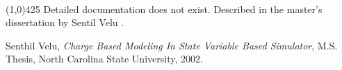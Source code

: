 \documentclass{article}
\begin{document}
\\
\hrulefill\linethickness{0.5mm}\line(1,0){425} \normalsize
\newline
Detailed documentation does not exist. Described in the master's dissertation by Sentil Velu \cite{velu:ms}.

\begin{thebibliography}{9}
Senthil Velu, \emph{Charge Based Modeling In State Variable Based Simulator}, M.S. Thesis, North Carolina State University, 2002.
\end{thebibliography}
\end{document}
